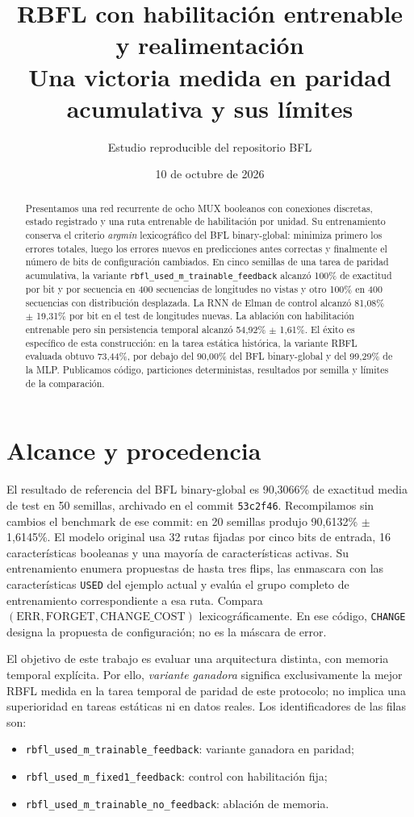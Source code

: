 \documentclass[10pt,a4paper]{article}
\title{RBFL con habilitación entrenable y realimentación\\
\large Una victoria medida en paridad acumulativa y sus límites}
\author{Estudio reproducible del repositorio BFL}
\date{10 de octubre de 2026}
\begin{document}
\maketitle

\begin{abstract}
Presentamos una red recurrente de ocho MUX booleanos con conexiones discretas, estado registrado y una ruta entrenable de habilitación por unidad. Su entrenamiento conserva el criterio \emph{argmin} lexicográfico del BFL binary-global: minimiza primero los errores totales, luego los errores nuevos en predicciones antes correctas y finalmente el número de bits de configuración cambiados. En cinco semillas de una tarea de paridad acumulativa, la variante \texttt{rbfl\_used\_m\_trainable\_feedback} alcanzó 100\% de exactitud por bit y por secuencia en 400 secuencias de longitudes no vistas y otro 100\% en 400 secuencias con distribución desplazada. La RNN de Elman de control alcanzó 81,08\% $\pm$ 19,31\% por bit en el test de longitudes nuevas. La ablación con habilitación entrenable pero sin persistencia temporal alcanzó 54,92\% $\pm$ 1,61\%. El éxito es específico de esta construcción: en la tarea estática histórica, la variante RBFL evaluada obtuvo 73,44\%, por debajo del 90,00\% del BFL binary-global y del 99,29\% de la MLP. Publicamos código, particiones deterministas, resultados por semilla y límites de la comparación.
\end{abstract}

\section{Alcance y procedencia}
El resultado de referencia del BFL binary-global es 90,3066\% de exactitud media de test en 50 semillas, archivado en el commit \texttt{53c2f46}. Recompilamos sin cambios el benchmark de ese commit: en 20 semillas produjo 90,6132\% $\pm$ 1,6145\%. El modelo original usa 32 rutas fijadas por cinco bits de entrada, 16 características booleanas y una mayoría de características activas. Su entrenamiento enumera propuestas de hasta tres flips, las enmascara con las características \texttt{USED} del ejemplo actual y evalúa el grupo completo de entrenamiento correspondiente a esa ruta. Compara $(\mathrm{ERR},\mathrm{FORGET},\mathrm{CHANGE\_COST})$ lexicográficamente. En ese código, \texttt{CHANGE} designa la propuesta de configuración; no es la máscara de error.

El objetivo de este trabajo es evaluar una arquitectura distinta, con memoria temporal explícita. Por ello, \emph{variante ganadora} significa exclusivamente la mejor RBFL medida en la tarea temporal de paridad de este protocolo; no implica una superioridad en tareas estáticas ni en datos reales. Los identificadores de las filas son:
\begin{itemize}
\item \texttt{rbfl\_used\_m\_trainable\_feedback}: variante ganadora en paridad;
\item \texttt{rbfl\_used\_m\_fixed1\_feedback}: control con habilitación fija;
\item \texttt{rbfl\_used\_m\_trainable\_no\_feedback}: ablación de memoria.
\end{itemize}
\end{document}
